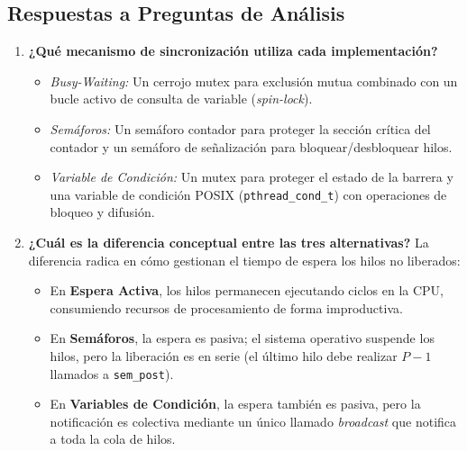 \documentclass[11pt,a4paper]{article}
\begin{document}
\subsection{Respuestas a Preguntas de Análisis}
\begin{enumerate}
    \item \textbf{¿Qué mecanismo de sincronización utiliza cada implementación?}
    \begin{itemize}
        \item \textit{Busy-Waiting:} Un cerrojo mutex para exclusión mutua combinado con un bucle activo de consulta de variable (\textit{spin-lock}).
        \item \textit{Semáforos:} Un semáforo contador para proteger la sección crítica del contador y un semáforo de señalización para bloquear/desbloquear hilos.
        \item \textit{Variable de Condición:} Un mutex para proteger el estado de la barrera y una variable de condición POSIX (\texttt{pthread\_cond\_t}) con operaciones de bloqueo y difusión.
    \end{itemize}

    \item \textbf{¿Cuál es la diferencia conceptual entre las tres alternativas?}
    La diferencia radica en cómo gestionan el tiempo de espera los hilos no liberados:
    \begin{itemize}
        \item En \textbf{Espera Activa}, los hilos permanecen ejecutando ciclos en la CPU, consumiendo recursos de procesamiento de forma improductiva.
        \item En \textbf{Semáforos}, la espera es pasiva; el sistema operativo suspende los hilos, pero la liberación es en serie (el último hilo debe realizar $P-1$ llamados a \texttt{sem\_post}).
        \item En \textbf{Variables de Condición}, la espera también es pasiva, pero la notificación es colectiva mediante un único llamado \textit{broadcast} que notifica a toda la cola de hilos.
    \end{itemize}


\end{enumerate}
\end{document}
